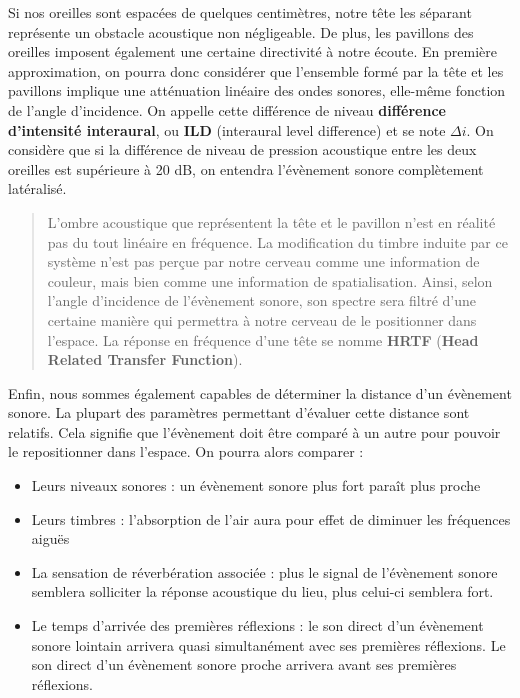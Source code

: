 \documentclass[
]{book}
\providecommand{\tightlist}{%
  \setlength{\itemsep}{0pt}\setlength{\parskip}{0pt}}
\begin{document}
Si nos oreilles sont espacées de quelques centimètres, notre tête les séparant représente un obstacle acoustique non négligeable. De plus, les pavillons des oreilles imposent également une certaine directivité à notre écoute. En première approximation, on pourra donc considérer que l'ensemble formé par la tête et les pavillons implique une atténuation linéaire des ondes sonores, elle-même fonction de l'angle d'incidence. On appelle cette différence de niveau \textbf{différence d'intensité interaural}, ou \textbf{ILD} (interaural level difference) et se note \(\Delta i\). On considère que si la différence de niveau de pression acoustique entre les deux oreilles est supérieure à 20 dB, on entendra l'évènement sonore complètement latéralisé.

\begin{quote}
L'ombre acoustique que représentent la tête et le pavillon n'est en réalité pas du tout linéaire en fréquence. La modification du timbre induite par ce système n'est pas perçue par notre cerveau comme une information de couleur, mais bien comme une information de spatialisation. Ainsi, selon l'angle d'incidence de l'évènement sonore, son spectre sera filtré d'une certaine manière qui permettra à notre cerveau de le positionner dans l'espace. La réponse en fréquence d'une tête se nomme \textbf{HRTF} (\textbf{Head Related Transfer Function}).
\end{quote}

Enfin, nous sommes également capables de déterminer la distance d'un évènement sonore. La plupart des paramètres permettant d'évaluer cette distance sont relatifs. Cela signifie que l'évènement doit être comparé à un autre pour pouvoir le repositionner dans l'espace. On pourra alors comparer :

\begin{itemize}
\tightlist
\item
  Leurs niveaux sonores : un évènement sonore plus fort paraît plus proche
\item
  Leurs timbres : l'absorption de l'air aura pour effet de diminuer les fréquences aiguës
\item
  La sensation de réverbération associée : plus le signal de l'évènement sonore semblera solliciter la réponse acoustique du lieu, plus celui-ci semblera fort.
\item
  Le temps d'arrivée des premières réflexions : le son direct d'un évènement sonore lointain arrivera quasi simultanément avec ses premières réflexions. Le son direct d'un évènement sonore proche arrivera avant ses premières réflexions.
\end{itemize}
\end{document}
